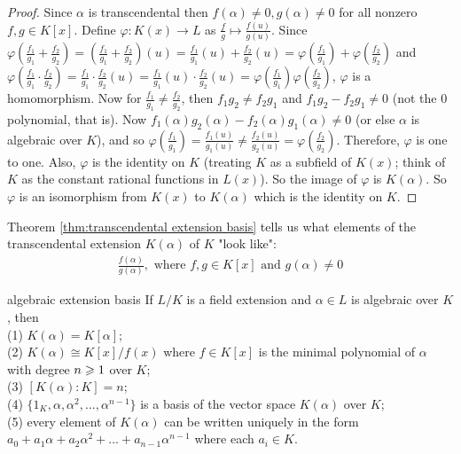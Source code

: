 \begin{proof}
    Since $\alpha$ is transcendental then 
    $f(\alpha)\neq 0,g(\alpha)\neq 0$ for all nonzero $f,g\in K[x]$.
    Define $\varphi :K(x)\rightarrow L$ as $\frac{f}{g}\mapsto \frac{f(u)}{g(u)}$. 
    Since $\varphi(\frac{f_1}{g_1}+\frac{f_2}{g_2})=(\frac{f_1}{g_1}+\frac{f_2}{g_2})(u)=\frac{f_1}{g_1}(u)+\frac{f_2}{g_2}(u)=\varphi(\frac{f_1}{g_1})+\varphi(\frac{f_2}{g_2})$
    and $\varphi(\frac{f_1}{g_1}\cdot \frac{f_2}{g_2})=\frac{f_1}{g_1}\cdot \frac{f_2}{g_2}(u)= \frac{f_1}{g_1}(u)\cdot \frac{f_2}{g_2}(u)=\varphi(\frac{f_1}{g_1})\varphi(\frac{f_2}{g_2})$, 
    $\varphi$ is a homomorphism. Now for $\frac{f_1}{g_1}\neq \frac{f_2}{g_2}$, then $f_1g_2\neq f_2g_1$ and $f_1g_2-f_2g_1\neq 0$ (not the $0$ polynomial, that is). 
    Now $f_1(\alpha)g_2(\alpha)-f_2(\alpha)g_1(\alpha)\neq 0$ (or else $\alpha$ is algebraic over $K$), and so
    $\varphi(\frac{f_1}{g_1})=\frac{f_1(u)}{g_1(u)}\neq \frac{f_2(u)}{g_2(u)}=\varphi(\frac{f_2}{g_2})$. 
    Therefore, $\varphi$ is one to one. Also, $\varphi$ is the identity on $K$ (treating $K$ as a subfield of $K(x)$; think of $K$ as the constant rational functions in $L(x)$).
    So the image of $\varphi$ is $K(\alpha)$. So $\varphi$ is an isomorphism from $K(x)$ to $K(\alpha)$ which is the identity on $K$.
\end{proof}

\begin{remark}
    Theorem \ref{thm:transcendental extension basis} tells us what elements of the transcendental extension $K(\alpha)$ of $K$
    "look like":
    \begin{align*}
        \frac{f(\alpha)}{g(\alpha)}, \text{ where } f,g\in K[x] \text{ and } g(\alpha)\neq 0 
    \end{align*}
\end{remark}

\begin{theorem}{}{algebraic extension basis}
    If $L/K$ is a field extension and $\alpha\in L$ is algebraic over $K$, then\\
    (1) $K(\alpha)=K[\alpha]$;\\
    (2) $K(\alpha)\cong K[x]/f(x)$ where $f\in K[x]$ is the minimal polynomial of $\alpha$ with degree $n \geqslant 1$ over $K$;\\
    (3) $[K(\alpha):K]=n$;\\
    (4) $\{1_K,\alpha,\alpha^2,...,\alpha^{n-1}\}$ is a basis of the vector space $K(\alpha)$ over $K$;\\
    (5) every element of $K(\alpha)$ can be written uniquely in the form $a_0+a_1\alpha+a_2\alpha^2+...+a_{n-1}\alpha^{n-1}$ where each $a_i\in K$.
\end{theorem}


